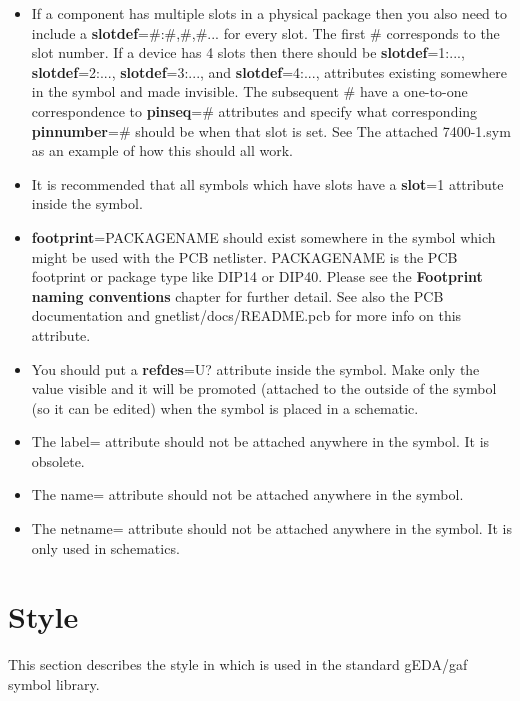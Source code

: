 \documentclass{article}
\begin{document}
\begin{itemize}
\item If a component has multiple slots in a physical package then you
      also need to include a {\bf slotdef}=\#:\#,\#,\#...
      for every slot.  The first \# corresponds to the slot number.
      If a device has 4 slots then there should be {\bf slotdef}=1:...,
      {\bf slotdef}=2:..., {\bf slotdef}=3:..., and {\bf slotdef}=4:...,
      attributes existing somewhere in the symbol and made invisible.
      The subsequent \# have a one-to-one correspondence to {\bf pinseq}=\#
      attributes and specify what corresponding {\bf pinnumber}=\#
      should be when that slot is set.  See The attached 7400-1.sym as
      an example of how this should all work.

\item It is recommended that all symbols which have slots have a {\bf
      slot}=1 attribute inside the symbol.

\item {\bf footprint}=PACKAGENAME should exist somewhere in the symbol
      which might be used with the PCB netlister.  PACKAGENAME is the
      PCB footprint or package type like DIP14 or DIP40.  Please see
      the {\bf Footprint naming conventions} chapter for further detail. 
      See also the PCB documentation and gnetlist/docs/README.pcb for 
      more info on this attribute.

\item You should put a {\bf refdes}=U? attribute inside the symbol.
      Make only the value visible and it will be promoted (attached to
      the outside of the symbol (so it can be edited) when the symbol
      is placed in a schematic.

\item The label= attribute should not be attached anywhere in
      the symbol.  It is obsolete.  

\item The name= attribute should not be attached anywhere in the symbol.

\item The netname= attribute should not be attached anywhere in the
      symbol.  It is only used in schematics.

\end{itemize}

\section{Style}

This section describes the style in which is used in the standard gEDA/gaf 
symbol library.
\end{document}
